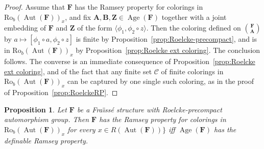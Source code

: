 \documentclass[11pt]{article}
\newtheorem{prop}[theo]{Proposition}
\theoremstyle{definition}
\numberwithin{equation}{section}
\numberwithin{figure}{section}
\numberwithin{table}{section}
\newcommand*{\mA}{\mathbf{A}}
\newcommand*{\mB}{\mathbf{B}}
\newcommand*{\mF}{\mathbf{F}}
\newcommand*{\mZ}{\mathbf{Z}}
\DeclareMathOperator{\Aut}{Aut}
\DeclareMathOperator{\Age}{Age}
\newcommand{\ROB}{\mathrm{Ro}_{b}}
\begin{document}
\begin{proof}
Assume that $\mF$ has the Ramsey property for colorings in $\ROB(\Aut(\mF))_{x}$, and fix $\mA, \mB, \mZ\in \Age(\mF)$ together with a joint embedding of $\mF$ and $\mZ$ of the form $\langle \phi_{1}, \phi_{2}\circ z\rangle$. Then the coloring defined on $\binom{\mF}{\mA}$ by $a\mapsto [\phi_{1} \circ a,\phi_{2}\circ z]$ is finite by Proposition~\ref{prop:Roelcke-precompact}, and is in $\ROB(\Aut(\mF))_{x}$ by Proposition~\ref{prop:Roelcke ext coloring}. The conclusion follows. The converse is an immediate consequence of Proposition~\ref{prop:Roelcke ext coloring}, and of the fact that any finite set $\mathcal C$ of finite colorings in $\ROB(\Aut(\mF))_{x}$ can be captured by one single such coloring, as in the proof of Proposition~\ref{prop:RoelckeRP}.
\end{proof}


\begin{prop}\label{prop:DefinableRP}
Let $\mF$ be a Fra\"{\i}ss\'e structure with Roelcke-precompact automorphism group. Then $\mF$ has the Ramsey property for colorings in $\ROB(\Aut(\mF))_{x}$ for every $x\in R(\Aut(\mF))\}$ iff $\Age(\mF)$ has the definable Ramsey property.
\end{prop}
\end{document}
